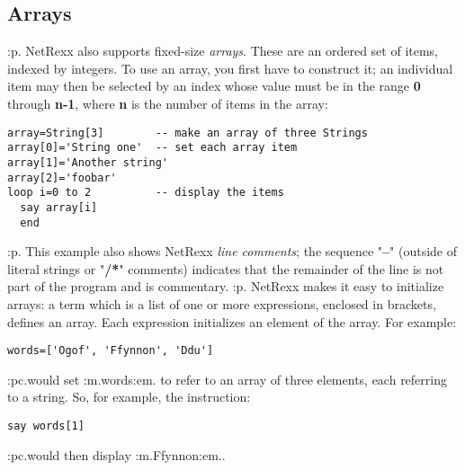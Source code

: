 \subsection{Arrays}\label{refoarray}
:p.
NetRexx also supports fixed-size \emph{arrays}.  These are an
ordered set of items, indexed by integers.  To use an array, you first
have to construct it; an individual item may then be selected by an
index whose value must be in the range \textbf{0}
through \textbf{n-1}, where \textbf{n} is the number of items in the
array:
\begin{verbatim}
array=String[3]        -- make an array of three Strings
array[0]='String one'  -- set each array item
array[1]='Another string'
array[2]='foobar'
loop i=0 to 2          -- display the items
  say array[i]
  end
\end{verbatim}
:p.
This example also shows NetRexx \emph{line comments}; the sequence
"\textbf{--}" (outside of literal strings or
"\textbf{/*}" comments) indicates that the remainder of the
line is not part of the program and is commentary.
:p.
NetRexx makes it easy to initialize arrays: a term which is a list of
one or more expressions, enclosed in brackets, defines an array.  Each
expression initializes an element of the array.
For example:
\begin{verbatim}
words=['Ogof', 'Ffynnon', 'Ddu']
\end{verbatim}
:pc.would set :m.words:em. to refer to an array of three elements, each
referring to a string.  So, for example, the instruction:
\begin{verbatim}
say words[1]
\end{verbatim}
:pc.would then display :m.Ffynnon:em..
